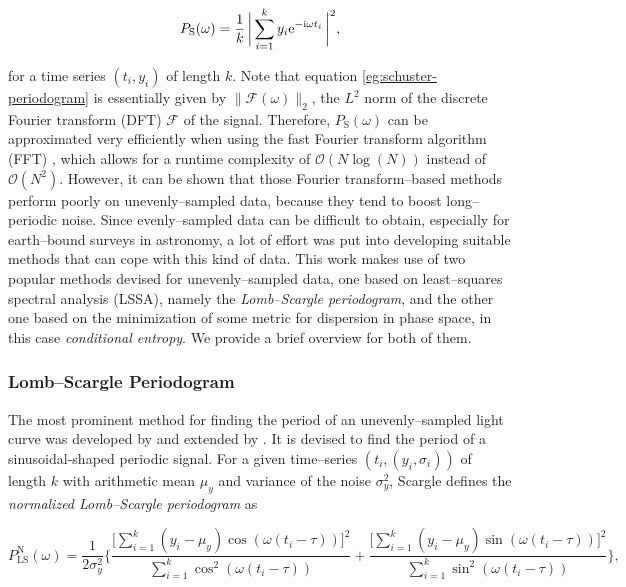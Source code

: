\begin{equation}
\label{eg:schuster-periodogram}
P_{\text{S}}(\omega) = \frac{1}{k} \, \biggl| \, \sum\limits_{i=1}^{k} y_i \mathrm{e}^{-\mathrm{i} \omega t_i} \, \biggr|^2,
\end{equation}


for a time series $(t_i, y_i)$ of length $k$. Note that equation \eqref{eg:schuster-periodogram} is essentially given by $\| \mathcal{F}(\omega) \|_2 $, the $L^2$ norm of the discrete Fourier transform (DFT) $\mathcal{F}$ of the signal. Therefore, $P_{\text{S}}(\omega)$ can be approximated very efficiently when using the fast Fourier transform algorithm (FFT) \citep{cooley1965}, which allows for a runtime complexity of $\mathcal{O}(N\log{(N)})$ instead of $\mathcal{O}(N^2)$. However, it can be shown that those Fourier transform--based methods perform poorly on unevenly--sampled data, because they tend to boost long--periodic noise. Since evenly--sampled data can be difficult to obtain, especially for earth--bound surveys in astronomy, a lot of effort was put into developing suitable methods that can cope with this kind of data. This work makes use of two popular methods devised for unevenly--sampled data, one based on least--squares spectral analysis (LSSA), namely the \emph{Lomb--Scargle periodogram}, and the other one based on the minimization of some metric for dispersion in phase space, in this case \emph{conditional entropy}. We provide a brief overview for both of them.

\subsubsection{Lomb--Scargle Periodogram}
\label{subsubsec:lomb-scargle}

The most prominent method for finding the period of an unevenly--sampled light curve was developed by \citet{lomb1976} and extended by \citet{scargle1982}. It is devised to find the period of a sinusoidal-shaped periodic signal. For a given time--series $(t_i, (y_i, \sigma_i))$ of length $k$ with arithmetic mean $\mu_y$ and variance of the noise $\sigma_y^2$, Scargle defines the \emph{normalized Lomb--Scargle periodogram} as

\begin{equation}
\label{eq:normalized-lomb-scargle}
P^{\text{N}}_{\text{LS}}(\omega) = \frac{1}{2 \sigma_y^2} \Bigg\{ \frac{\big[\sum\limits_{i=1}^k (y_i - \mu_y) \cos(\omega(t_i - \tau))\big]^2}{\sum\limits_{i=1}^k \cos^2(\omega(t_i - \tau))} + \frac{\big[\sum\limits_{i=1}^k (y_i - \mu_y) \sin(\omega(t_i - \tau))\big]^2}{\sum\limits_{i=1}^k \sin^2(\omega(t_i - \tau))}\Bigg\},
\end{equation}


